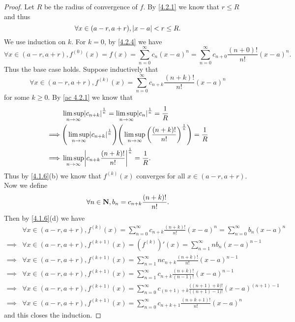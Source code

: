 \begin{proof}
  Let \(R\) be the radius of convergence of \(f\).
  By \cref{4.2.1} we know that \(r \leq R\) and thus
  \[
    \forall x \in (a - r, a + r), \left\lvert x - a\right\rvert < r \leq R.
  \]
  We use induction on \(k\).
  For \(k = 0\), by \cref{4.2.4} we have
  \[
    \forall x \in (a - r, a + r), f^{(0)}(x) = f(x) = \sum_{n = 0}^\infty c_n (x - a)^n = \sum_{n = 0}^\infty c_{n + 0} \frac{(n + 0)!}{n!} (x - a)^n.
  \]
  Thus the base case holds.
  Suppose inductively that
  \[
    \forall x \in (a - r, a + r), f^{(k)}(x) = \sum_{n = 0}^\infty c_{n + k} \frac{(n + k)!}{n!} (x - a)^n
  \]
  for some \(k \geq 0\).
  By \cref{ac 4.2.1} we know that
  \begin{align*}
             & \limsup_{n \to \infty} \abs{c_{n + k}}^{\frac{1}{n}} = \limsup_{n \to \infty} \abs{c_n}^{\frac{1}{n}} = \frac{1}{R}                                             \\
    \implies & \Bigg(\limsup_{n \to \infty} \abs{c_{n + k}}^{\frac{1}{n}}\Bigg) \Bigg(\limsup_{n \to \infty} \bigg(\frac{(n + k)!}{n!}\bigg)^{\frac{1}{n}}\Bigg) = \frac{1}{R} \\
    \implies & \limsup_{n \to \infty} \abs{c_{n + k} \frac{(n + k)!}{n!}}^{\frac{1}{n}} = \frac{1}{R}.
  \end{align*}
  Thus by \cref{4.1.6}(b) we know that \(f^{(k)}(x)\) converges for all \(x \in (a - r, a + r)\).
  Now we define
  \[
    \forall n \in \mathbf{N}, b_n = c_{n + k} \frac{(n + k)!}{n!}.
  \]
  Then by \cref{4.1.6}(d) we have
  \begin{align*}
             & \forall x \in (a - r, a + r), f^{(k)}(x) = \sum_{n = 0}^\infty c_{n + k} \frac{(n + k)!}{n!} (x - a)^n = \sum_{n = 0}^\infty b_n (x - a)^n                     \\
    \implies & \forall x \in (a - r, a + r), f^{(k + 1)}(x) = (f^{(k)})'(x) = \sum_{n = 1}^\infty n b_n (x - a)^{n - 1}                                                       \\
    \implies & \forall x \in (a - r, a + r), f^{(k + 1)}(x) = \sum_{n = 1}^\infty n c_{n + k} \frac{(n + k)!}{n!} (x - a)^{n - 1}                                             \\
    \implies & \forall x \in (a - r, a + r), f^{(k + 1)}(x) = \sum_{n = 1}^\infty c_{n + k} \frac{(n + k)!}{(n - 1)!} (x - a)^{n - 1}                                         \\
    \implies & \forall x \in (a - r, a + r), f^{(k + 1)}(x) = \sum_{n = 0}^\infty c_{(n + 1) + k} \frac{\big((n + 1) + k\big)!}{\big((n + 1) - 1\big)!} (x - a)^{(n + 1) - 1} \\
    \implies & \forall x \in (a - r, a + r), f^{(k + 1)}(x) = \sum_{n = 0}^\infty c_{n + k + 1} \frac{(n + k + 1)!}{n!} (x - a)^n
  \end{align*}
  and this closes the induction.
\end{proof}

